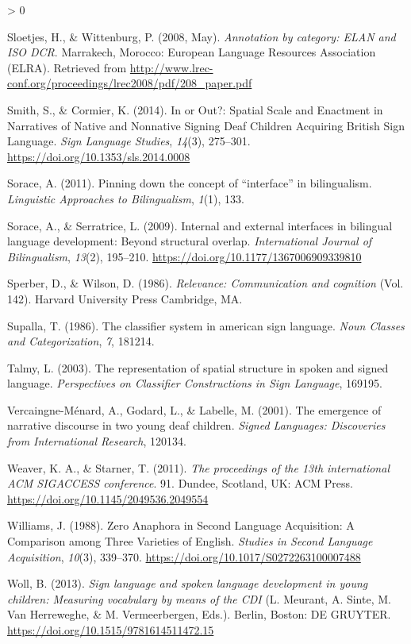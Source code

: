 \documentclass[
  english,
  doc,mask]{apa6}
\newlength{\cslhangindent}
\newenvironment{CSLReferences}[2] %
 {%
  \setlength{\parindent}{0pt}
  \ifodd #1 \everypar{\setlength{\hangindent}{\cslhangindent}}\ignorespaces\fi
  \ifnum #2 > 0
  \setlength{\parskip}{#2\baselineskip}
  \fi
 }%
 {}
\begin{document}
\begin{CSLReferences}{1}{0}
\leavevmode\hypertarget{ref-sloetjes2008}{}%
Sloetjes, H., \& Wittenburg, P. (2008, May). \emph{Annotation by category: ELAN and ISO DCR}. Marrakech, Morocco: European Language Resources Association (ELRA). Retrieved from \url{http://www.lrec-conf.org/proceedings/lrec2008/pdf/208_paper.pdf}

\leavevmode\hypertarget{ref-smith2014}{}%
Smith, S., \& Cormier, K. (2014). In or Out?: Spatial Scale and Enactment in Narratives of Native and Nonnative Signing Deaf Children Acquiring British Sign Language. \emph{Sign Language Studies}, \emph{14}(3), 275--301. \url{https://doi.org/10.1353/sls.2014.0008}

\leavevmode\hypertarget{ref-sorace2011}{}%
Sorace, A. (2011). Pinning down the concept of {``}interface{''} in bilingualism. \emph{Linguistic Approaches to Bilingualism}, \emph{1}(1), 133.

\leavevmode\hypertarget{ref-sorace2009}{}%
Sorace, A., \& Serratrice, L. (2009). Internal and external interfaces in bilingual language development: Beyond structural overlap. \emph{International Journal of Bilingualism}, \emph{13}(2), 195--210. \url{https://doi.org/10.1177/1367006909339810}

\leavevmode\hypertarget{ref-sperber1986}{}%
Sperber, D., \& Wilson, D. (1986). \emph{Relevance: Communication and cognition} (Vol. 142). Harvard University Press Cambridge, MA.

\leavevmode\hypertarget{ref-supalla1986}{}%
Supalla, T. (1986). The classifier system in american sign language. \emph{Noun Classes and Categorization}, \emph{7}, 181214.

\leavevmode\hypertarget{ref-talmy2003}{}%
Talmy, L. (2003). The representation of spatial structure in spoken and signed language. \emph{Perspectives on Classifier Constructions in Sign Language}, 169195.

\leavevmode\hypertarget{ref-vercaingne-muxe9nard2001}{}%
Vercaingne-Ménard, A., Godard, L., \& Labelle, M. (2001). The emergence of narrative discourse in two young deaf children. \emph{Signed Languages: Discoveries from International Research}, 120134.

\leavevmode\hypertarget{ref-weaver2011}{}%
Weaver, K. A., \& Starner, T. (2011). \emph{The proceedings of the 13th international ACM SIGACCESS conference}. 91. Dundee, Scotland, UK: ACM Press. \url{https://doi.org/10.1145/2049536.2049554}

\leavevmode\hypertarget{ref-williams1988}{}%
Williams, J. (1988). Zero Anaphora in Second Language Acquisition: A Comparison among Three Varieties of English. \emph{Studies in Second Language Acquisition}, \emph{10}(3), 339--370. \url{https://doi.org/10.1017/S0272263100007488}

\leavevmode\hypertarget{ref-woll2013}{}%
Woll, B. (2013). \emph{Sign language and spoken language development in young children: Measuring vocabulary by means of the CDI} (L. Meurant, A. Sinte, M. Van Herreweghe, \& M. Vermeerbergen, Eds.). Berlin, Boston: DE GRUYTER. \url{https://doi.org/10.1515/9781614511472.15}

\end{CSLReferences}
\end{document}
